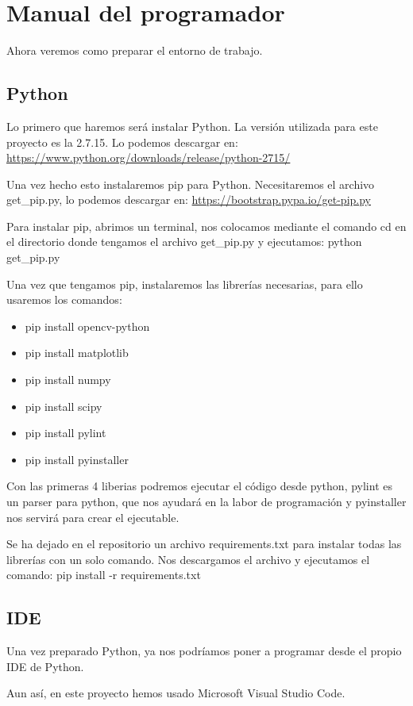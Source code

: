\section{Manual del programador}
Ahora veremos como preparar el entorno de trabajo.

\subsection{Python}
Lo primero que haremos será instalar Python. La versión utilizada para este proyecto es la 2.7.15.
Lo podemos descargar en:
\url{https://www.python.org/downloads/release/python-2715/}

Una vez hecho esto instalaremos pip para Python. Necesitaremos el archivo get\_pip.py, lo podemos descargar en:
\url{https://bootstrap.pypa.io/get-pip.py}

Para instalar pip, abrimos un terminal, nos colocamos mediante el comando cd en el directorio donde tengamos el archivo get\_pip.py y ejecutamos: python get\_pip.py

Una vez que tengamos pip, instalaremos las librerías necesarias, para ello usaremos los comandos:

\begin{itemize}
	\item pip install opencv-python
	\item pip install matplotlib
	\item pip install numpy
	\item pip install scipy
	\item pip install pylint
	\item pip install pyinstaller
\end{itemize}

Con las primeras 4 liberias podremos ejecutar el código desde python, pylint es un parser para python, que nos ayudará en la labor de programación y pyinstaller nos servirá para crear el ejecutable.

Se ha dejado en el repositorio un archivo requirements.txt para instalar todas las librerías con un solo comando. Nos descargamos el archivo y ejecutamos el comando: pip install -r requirements.txt

\subsection{IDE}
Una vez preparado Python, ya nos podríamos poner a programar desde el propio IDE de Python. 

Aun así, en este proyecto hemos usado Microsoft Visual Studio Code.

